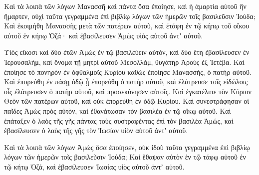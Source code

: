 {\par }{\PP {}Καὶ τὰ λοιπὰ τῶν λόγων Μανασσῆ καὶ πάντα ὅσα ἐποίησε, καὶ ἡ ἁμαρτία αὐτοῦ ἣν ἥμαρτεν, οὐχὶ ταῦτα γεγραμμένα ἐπὶ βιβλίῳ λόγων τῶν ἡμερῶν τοῖς βασιλεῦσιν Ἰούδα;
Καὶ ἐκοιμήθη Μανασσὴς μετὰ τῶν πατέρων αὐτοῦ, καὶ ἐτάφη ἐν τῷ κήπῳ τοῦ οἴκου αὐτοῦ ἐν κήπῳ Ὀζά· καὶ ἐβασίλευσεν Ἀμὼς υἱὸς αὐτοῦ ἀντʼ αὐτοῦ.
\par }{\PP {}Υἱὸς εἴκοσι καὶ δύο ἐτῶν Ἀμὼς ἐν τῷ βασιλεύειν αὐτόν, καὶ δύο ἔτη ἐβασίλευσεν ἐν Ἱερουσαλήμ, καὶ ὄνομα τῇ μητρὶ αὐτοῦ Μεσολλάμ, θυγάτηρ Ἀροὺς ἐξ Ἰετέβα.
Καὶ ἐποίησε τὸ πονηρὸν ἐν ὀφθαλμοῖς Κυρίου καθὼς ἐποίησε Μανασσὴς, ὁ πατὴρ αὐτοῦ.
Καὶ ἐπορεύθη ἐν πάσῃ ὁδῷ ᾗ ἐπορεύθη ὁ πατὴρ αὐτοῦ, καὶ ἐλάτρευσε τοῖς εἰδώλοις οἷς ἐλάτρευσεν ὁ πατὴρ αὐτοῦ, καὶ προσεκύνησεν αὐτοῖς.
Καὶ ἐγκατέλιπε τὸν Κύριον Θεὸν τῶν πατέρων αὐτοῦ, καὶ οὐκ ἐπορεύθη ἐν ὁδῷ Κυρίου.
Καὶ συνεστράφησαν οἱ παῖδες Ἀμὼς πρὸς αὐτὸν, καὶ ἐθανάτωσαν τὸν βασιλέα ἐν τῷ οἴκῳ αὐτοῦ.
Καὶ ἐπάταξεν ὁ λαὸς τῆς γῆς πάντας τοὺς συστραφέντας ἐπὶ τὸν βασιλέα Ἀμώς, καὶ ἐβασίλευσεν ὁ λαὸς τῆς γῆς τὸν Ἰωσίαν υἱὸν αὐτοῦ ἀντʼ αὐτοῦ.
\par }{\PP {}Καὶ τὰ λοιπὰ τῶν λόγων Ἀμὼς ὅσα ἐποίησεν, οὐκ ἰδοὺ ταῦτα γεγραμμένα ἐπὶ βιβλίῳ λόγων τῶν ἡμερῶν τοῖς βασιλεῦσιν Ἰούδα;
Καὶ ἔθαψαν αὐτὸν ἑν τῷ τάφῳ αὐτοῦ ἑν τῷ κήτῳ Ὀζά, καὶ ἐβασίλευσεν Ἰωσίας υἱὸς αὐτοῦ ἀντʼ αὐτοῦ.

}
